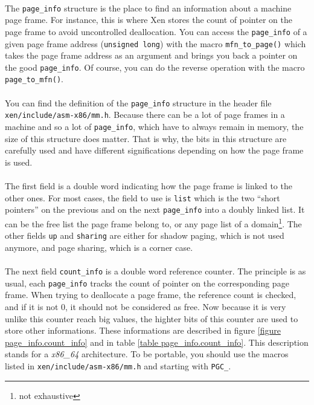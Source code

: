 \newcommand{\pageinfo}{\texttt{page\_info}\xspace}
\newcommand{\countinfo}{\texttt{count\_info}\xspace}
\newcommand{\ulong}{\texttt{unsigned long}\xspace}
\newcommand{\mfn}{\texttt{mfn_t}\xspace}

\paragraph{}
The \pageinfo structure is the place to find an information about
a machine page frame.
For instance, this is where Xen stores the count of pointer on the page frame
to avoid uncontrolled deallocation.
You can access the \pageinfo of a given page frame address (\ulong) with the
macro \texttt{mfn\_to\_page()} which takes the page frame address as an
argument and brings you back a pointer on the good \pageinfo.
Of course, you can do the reverse operation with the macro
\texttt{page\_to\_mfn()}.

\paragraph{}
You can find the definition of the \pageinfo structure in the header file
\texttt{xen/include/asm-x86/mm.h}.
Because there can be a lot of page frames in a machine and so a lot of
\pageinfo, which have to always remain in memory, the size of this structure
does matter.
That is why, the bits in this structure are carefully used and have different
significations depending on how the page frame is used.

\paragraph{}
The first field is a double word indicating how the page frame is linked to
the other ones.
For most cases, the field to use is \texttt{list} which is the two
``short pointers'' on the previous and on the next \pageinfo into a doubly
linked list.
It can be the free list the page frame belong to, or any page list of a
domain\footnote{not exhaustive}.
The other fields \texttt{up} and \texttt{sharing} are either for shadow paging,
which is not used anymore, and page sharing, which is a corner case.

\paragraph{}
The next field \countinfo is a double word reference counter.
The principle is as usual, each \pageinfo tracks the count of pointer on the
corresponding page frame.
When trying to deallocate a page frame, the reference count is checked, and if
it is not 0, it should not be considered as free.
Now because it is very unlike this counter reach big values, the highter bits
of this counter are used to store other informations.
These informations are described in figure \ref{figure page_info.count_info}
and in table \ref{table page_info.count_info}.
This description stands for a \emph{x86\_64} architecture.
To be portable, you should use the macros listed in
\texttt{xen/include/asm-x86/mm.h} and starting with \texttt{PGC\_}.

